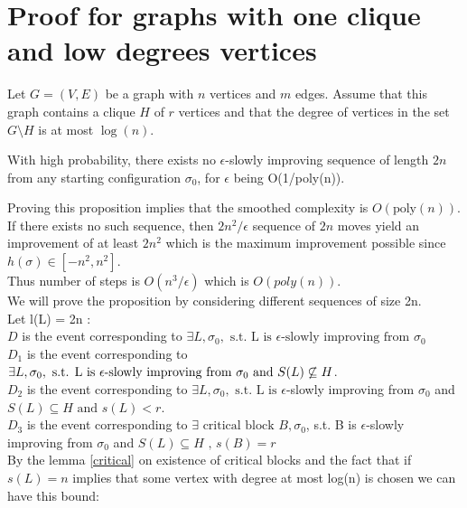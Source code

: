 \section{Proof for graphs with one clique and low degrees vertices}
\label{sec::firstProof}
Let $G = (V,E)$ be a graph with $n$ vertices and $m$ edges. Assume that this graph contains a clique $H$ of $r$ vertices and that the degree of vertices in the set $G \setminus H$ is at most $\log(n)$. \\

\begin{proposition}
\label{prop}
With high probability, there exists no $\epsilon$-slowly improving sequence of length $2n$ from any starting configuration $\sigma_0$, for $\epsilon$ being O(1/poly(n)).
\end{proposition}

Proving this proposition implies that the smoothed complexity is $O(\text{poly}(n))$. \\
If there exists no such sequence, then $2n^2/\epsilon$ sequence of $2n$ moves yield an improvement of at least $2n^2$ which is the maximum improvement possible since $h(\sigma) \in [-n^2,n^2]$. \\
Thus number of steps is $O(n^3/\epsilon)$ which is $O(poly(n))$. \\

We will prove the proposition by considering different sequences of size 2n.\\
Let l(L) = 2n : \\
$D$ is the event corresponding to $\exists L, \sigma_0, \text{ s.t. L is }\epsilon\text{-slowly improving from }\sigma_0 $\\
$D_1$ is the event corresponding to $\exists L, \sigma_0, \text{ s.t. L is }\epsilon\text{-slowly improving from }\sigma_0 \\
\text{ and }S(L) \not\subseteq H$.\\
$D_2$ is the event corresponding to $\exists L, \sigma_0,\text{ s.t. L is }\epsilon$-slowly  improving from $\sigma_0$ and $S(L) \subseteq H\text{ and }s(L) < r$. \\
$D_3$   is the event corresponding to $\exists \text{ critical block } B, \sigma_0$, s.t. B is $\epsilon$-slowly improving from $\sigma_0$ and $S(L) \subseteq H \text{ , } s(B) = r $\\
By the lemma \ref{critical} on existence of critical blocks and the fact that if $s(L) = n$ implies that some vertex with degree at most log(n) is chosen we can have this bound:

